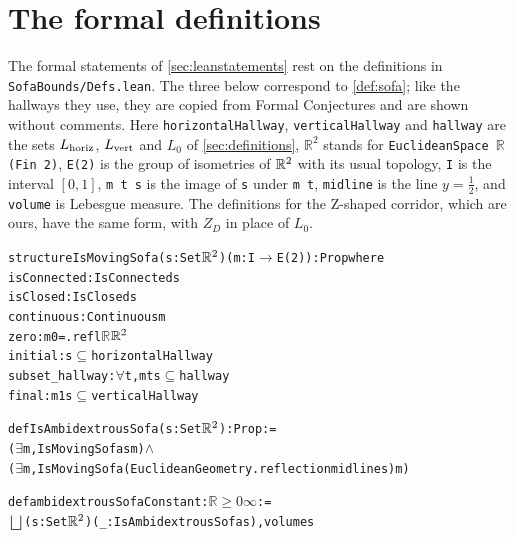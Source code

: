\section{The formal definitions}\label{app:data}

The formal statements of \cref{sec:leanstatements} rest on the definitions in \texttt{SofaBounds/Defs.lean}. The three below correspond to \cref{def:sofa}; like the hallways they use, they are copied from Formal Conjectures \cite{formalconjectures,fc_pr6424} and are shown without comments. Here \texttt{horizontalHallway}, \texttt{verticalHallway} and \texttt{hallway} are the sets $L_{\mathrm{horiz}}$, $L_{\mathrm{vert}}$ and $L_0$ of \cref{sec:definitions}, $\mathbb{R}^2$ stands for \texttt{EuclideanSpace \(\mathbb{R}\) (Fin 2)}, \texttt{E(2)} is the group of isometries of $\mathbb{R}^2$ with its usual topology, \texttt{I} is the interval $[0,1]$, \texttt{m t \textquotesingle\textquotesingle{} s} is the image of \texttt{s} under \texttt{m t}, \texttt{midline} is the line $y=\frac12$, and \texttt{volume} is Lebesgue measure. The definitions for the Z-shaped corridor, which are ours, have the same form, with $Z_D$ in place of $L_0$.
\begin{alltt}\footnotesize
structure IsMovingSofa (s : Set \(\mathbb{R}\sp{2}\)) (m : I \(\to\) E(2)) : Prop where
  isConnected : IsConnected s
  isClosed : IsClosed s
  continuous : Continuous m
  zero : m 0 = .refl \(\mathbb{R}\) \(\mathbb{R}\sp{2}\)
  initial : s \(\subseteq\) horizontalHallway
  subset_hallway : \(\forall\) t, m t \textquotesingle\textquotesingle{} s \(\subseteq\) hallway
  final : m 1 \textquotesingle\textquotesingle{} s \(\subseteq\) verticalHallway
\end{alltt}
\begin{alltt}\footnotesize
def IsAmbidextrousSofa (s : Set \(\mathbb{R}\sp{2}\)) : Prop :=
  (\(\exists\) m, IsMovingSofa s m) \(\wedge\)
    (\(\exists\) m, IsMovingSofa (EuclideanGeometry.reflection midline \textquotesingle\textquotesingle{} s) m)
\end{alltt}
\begin{alltt}\footnotesize
def ambidextrousSofaConstant : \(\mathbb{R}{\ge}0\infty\) :=
  \(\bigsqcup\) (s : Set \(\mathbb{R}\sp{2}\)) (_ : IsAmbidextrousSofa s), volume s
\end{alltt}
